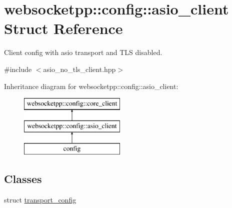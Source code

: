 \hypertarget{structwebsocketpp_1_1config_1_1asio__client}{}\section{websocketpp\+:\+:config\+:\+:asio\+\_\+client Struct Reference}
\label{structwebsocketpp_1_1config_1_1asio__client}


Client config with asio transport and T\+LS disabled.  




{\ttfamily \#include $<$asio\+\_\+no\+\_\+tls\+\_\+client.\+hpp$>$}

Inheritance diagram for websocketpp\+:\+:config\+:\+:asio\+\_\+client\+:\begin{figure}[H]
\begin{center}
\leavevmode
\includegraphics[height=3.000000cm]{structwebsocketpp_1_1config_1_1asio__client}
\end{center}
\end{figure}
\subsection*{Classes}
\begin{DoxyCompactItemize}
\item 
struct \hyperlink{structwebsocketpp_1_1config_1_1asio__client_1_1transport__config}{transport\+\_\+config}
\end{DoxyCompactItemize}
